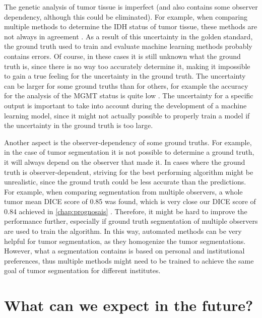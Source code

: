 The genetic analysis of tumor tissue is imperfect (and also contains some observer dependency, although this could be eliminated).
For example, when comparing multiple methods to determine the \gls{IDH} status of \gls{tumor} tissue, these methods are not always in agreement \autocite{pyo2016concordance}.
As a result of this uncertainty in the golden standard, the ground truth used to train and evaluate machine learning methods probably contains errors.
Of course, in these cases it is still unknown what the  ground truth is, since there is no way too  accurately determine it, making it impossible to gain a true feeling for the uncertainty in the ground truth.
The uncertainty can be larger for some ground truths than for others, for example the accuracy for the analysis of the \gls{MGMT} status is quite low \autocite{wang2017mgmt}.
The uncertainty for a specific output is important to take into account during the development of a machine learning model, since it might not actually possible to properly train a model if the uncertainty in the ground truth is too large.

Another aspect is the observer-dependency of some ground truths.
For example, in the case of tumor segmentation it is not possible to determine a  ground truth, it will always depend on the observer that made it.
In cases where the ground truth is observer-dependent, striving for the best performing algorithm might be unrealistic, since the ground truth could be less accurate than the predictions.
For example, when comparing segmentation from multiple observers, a whole \gls{tumor} mean DICE score of 0.85 was found, which is very close our DICE score of 0.84 achieved in \cref{chap:prognosais} \autocite{menze2015brats}.
Therefore, it might be hard to improve the performance further, especially if ground truth segmentation of multiple observers are used to train the algorithm.
In this way, automated methods can be very helpful for \gls{tumor} segmentation, as they homogenize the \gls{tumor} segmentations.
However, what a segmentation contains is based on personal and institutional preferences, thus multiple methods might need to be trained to achieve the same goal of \gls{tumor} segmentation for different institutes.


\section{What can we expect in the future?}\label{sec:discussion_future}

